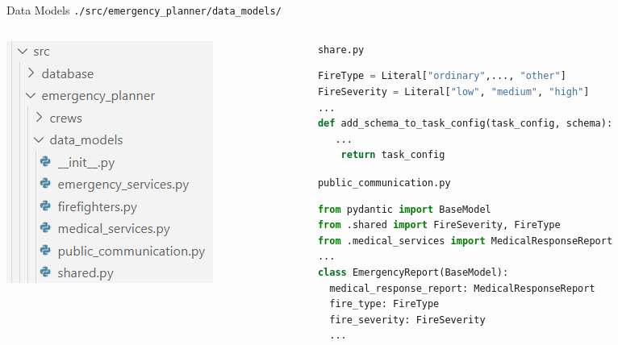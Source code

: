 \begin{frame}[fragile]{Data Models}
  \texttt{./src/emergency\_planner/data\_models/}
  \begin{columns}[T]
    \begin{column}{0.3\textwidth}
        \includegraphics[width=\textwidth]{figures/data_models_folder.png}
    \end{column}
    \begin{column}{0.68\textwidth}
      \texttt{share.py}
      \begin{lstlisting}[language=Python, breaklines=true]
FireType = Literal["ordinary",..., "other"]
FireSeverity = Literal["low", "medium", "high"]
... 
def add_schema_to_task_config(task_config, schema):
   ...
    return task_config
      \end{lstlisting}
      \texttt{public\_communication.py}
      \begin{lstlisting}[language=Python, breaklines=true]
from pydantic import BaseModel
from .shared import FireSeverity, FireType
from .medical_services import MedicalResponseReport
...
class EmergencyReport(BaseModel):
  medical_response_report: MedicalResponseReport
  fire_type: FireType
  fire_severity: FireSeverity
  ...
      \end{lstlisting}
    \end{column}
  \end{columns}
\end{frame}